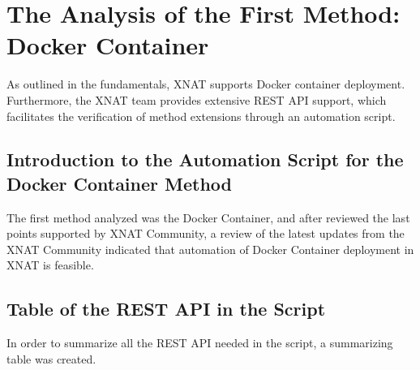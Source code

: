 \chapter{The Analysis of the First Method: Docker Container}
As outlined in the fundamentals, XNAT supports Docker container deployment. Furthermore, the XNAT team provides extensive REST API support, which facilitates the verification of method extensions through an automation script.

\section{Introduction to the Automation Script for the Docker Container Method}
The first method analyzed was the Docker Container, and after reviewed the last points supported by XNAT Community, a review of the latest updates from the XNAT Community indicated that automation of Docker Container deployment in XNAT is feasible.

\section{Table of the REST API in the Script}

In order to summarize all the REST API needed in the script, a summarizing table was created.

